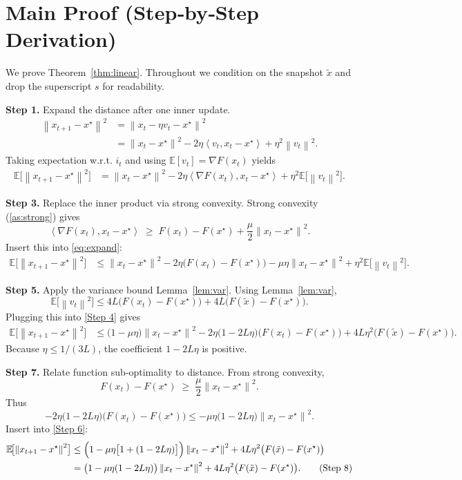 \documentclass{article}
\newcommand{\E}{\mathbb{E}}
\newcommand{\norm}[1]{\left\|#1\right\|}
\newcommand{\inner}[2]{\left\langle #1,#2\right\rangle}
\begin{document}
\section*{Main Proof (Step‑by‑Step Derivation)}
We prove Theorem~\ref{thm:linear}. Throughout we condition on the snapshot $\tilde{x}$ and drop the superscript $s$ for readability.

\noindent\textbf{Step 1.}  Expand the distance after one inner update.
\begin{align}
\norm{x_{t+1}-x^\star}^2
&= \norm{x_t-\eta v_t - x^\star}^2 \nonumber\\
&= \norm{x_t-x^\star}^2 -2\eta\inner{v_t}{x_t-x^\star}+\eta^2\norm{v_t}^2 .\label{eq:expand}
\end{align}
Taking expectation w.r.t. $i_t$ and using $\E[v_t]=\nabla F(x_t)$ yields
\begin{align}
\E\!\bigl[\norm{x_{t+1}-x^\star}^2\bigr]
&= \norm{x_t-x^\star}^2 -2\eta\inner{\nabla F(x_t)}{x_t-x^\star}
   +\eta^2\E\!\bigl[\norm{v_t}^2\bigr]. \tag{Step 2}
\end{align}

\noindent\textbf{Step 3.}  Replace the inner product via strong convexity.
Strong convexity (\ref{as:strong}) gives
\[
\inner{\nabla F(x_t)}{x_t-x^\star}\;\ge\;F(x_t)-F(x^\star)+\frac{\mu}{2}\norm{x_t-x^\star}^2 .
\]
Insert this into \eqref{eq:expand}:
\begin{align}
\E\!\bigl[\norm{x_{t+1}-x^\star}^2\bigr]
&\le \norm{x_t-x^\star}^2 -2\eta\bigl(F(x_t)-F(x^\star)\bigr)-\mu\eta\norm{x_t-x^\star}^2
   +\eta^2\E\!\bigl[\norm{v_t}^2\bigr]. \tag{Step 4}
\end{align}

\noindent\textbf{Step 5.}  Apply the variance bound Lemma~\ref{lem:var}.
Using Lemma~\ref{lem:var},
\[
\E\!\bigl[\norm{v_t}^2\bigr]\le 4L\bigl(F(x_t)-F(x^\star)\bigr)+4L\bigl(F(\tilde{x})-F(x^\star)\bigr).
\]
Plugging this into \eqref{Step 4} gives
\begin{align}
\E\!\bigl[\norm{x_{t+1}-x^\star}^2\bigr]
&\le \bigl(1-\mu\eta\bigr)\norm{x_t-x^\star}^2
   -2\eta\bigl(1-2L\eta\bigr)\bigl(F(x_t)-F(x^\star)\bigr)
   +4L\eta^2\bigl(F(\tilde{x})-F(x^\star)\bigr). \tag{Step 6}
\end{align}
Because $\eta\le 1/(3L)$, the coefficient $1-2L\eta$ is positive.

\noindent\textbf{Step 7.}  Relate function sub‑optimality to distance.
From strong convexity,
\[
F(x_t)-F(x^\star)\;\ge\;\frac{\mu}{2}\norm{x_t-x^\star}^2 .
\]
Thus
\[
-2\eta\bigl(1-2L\eta\bigr)\bigl(F(x_t)-F(x^\star)\bigr)
\le -\mu\eta\bigl(1-2L\eta\bigr)\norm{x_t-x^\star}^2 .
\]
Insert into \eqref{Step 6}:
\begin{align}
\E\!\bigl[\norm{x_{t+1}-x^\star}^2\bigr]
&\le \Bigl(1-\mu\eta\bigl[1+(1-2L\eta)\bigr]\Bigr)\norm{x_t-x^\star}^2
   +4L\eta^2\bigl(F(\tilde{x})-F(x^\star)\bigr) \nonumber\\
&= \bigl(1-\mu\eta(1-2L\eta)\bigr)\norm{x_t-x^\star}^2
   +4L\eta^2\bigl(F(\tilde{x})-F(x^\star)\bigr). \tag{Step 8}
\end{align}
\end{document}
